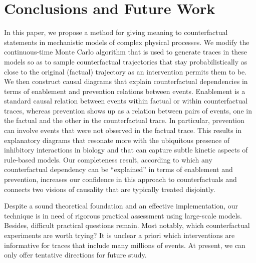 
\section*{Conclusions and Future Work}

In this paper, we propose a method for giving meaning to
counterfactual statements in mechanistic models of
complex physical processes.  We modify the continuous-time Monte Carlo
algorithm that is used to generate traces in these models so as to
sample counterfactual trajectories that stay probabilistically as
close to the original (factual) trajectory as an intervention permits
them to be. We then construct causal diagrams that explain
counterfactual dependencies in terms of enablement and prevention
relations between events. Enablement is a standard causal relation
between events within factual or within counterfactual traces, whereas
prevention shows up as a relation between pairs of events, one in the
factual and the other in the counterfactual trace. In particular,
prevention can involve events that were not observed in the factual
trace. This results in explanatory diagrams that resonate more with
the ubiquitous presence of inhibitory interactions in biology and that
can capture subtle kinetic aspects of rule-based models.  Our
completeness result, according to which any counterfactual dependency
can be ``explained'' in terms of enablement and prevention, increases
our confidence in this approach to counterfactuals and connects two
visions of causality that are typically treated disjointly.

Despite a sound theoretical foundation and an effective
implementation, our technique is in need of rigorous practical
assessment using large-scale models. Besides, difficult practical
questions remain. Most notably, which counterfactual experiments are
worth trying? It is unclear a priori which interventions are
informative for traces that include many millions of events. At
present, we can only offer tentative directions for future study.

